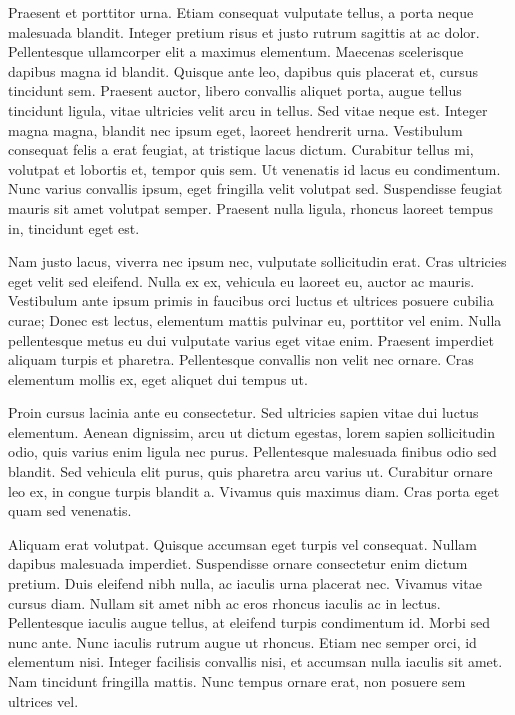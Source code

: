 Praesent et porttitor urna. Etiam consequat vulputate tellus, a porta neque
malesuada blandit. Integer pretium risus et justo rutrum sagittis at ac dolor.
Pellentesque ullamcorper elit a maximus elementum. Maecenas scelerisque dapibus
magna id blandit. Quisque ante leo, dapibus quis placerat et, cursus tincidunt
sem. Praesent auctor, libero convallis aliquet porta, augue tellus tincidunt
ligula, vitae ultricies velit arcu in tellus. Sed vitae neque est. Integer
magna magna, blandit nec ipsum eget, laoreet hendrerit urna. Vestibulum
consequat felis a erat feugiat, at tristique lacus dictum. Curabitur tellus mi,
volutpat et lobortis et, tempor quis sem. Ut venenatis id lacus eu condimentum.
Nunc varius convallis ipsum, eget fringilla velit volutpat sed. Suspendisse
feugiat mauris sit amet volutpat semper. Praesent nulla ligula, rhoncus laoreet
tempus in, tincidunt eget est.

Nam justo lacus, viverra nec ipsum nec, vulputate sollicitudin erat. Cras
ultricies eget velit sed eleifend. Nulla ex ex, vehicula eu laoreet eu, auctor
ac mauris. Vestibulum ante ipsum primis in faucibus orci luctus et ultrices
posuere cubilia curae; Donec est lectus, elementum mattis pulvinar eu,
porttitor vel enim. Nulla pellentesque metus eu dui vulputate varius eget vitae
enim. Praesent imperdiet aliquam turpis et pharetra. Pellentesque convallis non
velit nec ornare. Cras elementum mollis ex, eget aliquet dui tempus ut.

Proin cursus lacinia ante eu consectetur. Sed ultricies sapien vitae dui luctus
elementum. Aenean dignissim, arcu ut dictum egestas, lorem sapien sollicitudin
odio, quis varius enim ligula nec purus. Pellentesque malesuada finibus odio
sed blandit. Sed vehicula elit purus, quis pharetra arcu varius ut. Curabitur
ornare leo ex, in congue turpis blandit a. Vivamus quis maximus diam. Cras
porta eget quam sed venenatis.

Aliquam erat volutpat. Quisque accumsan eget turpis vel consequat. Nullam
dapibus malesuada imperdiet. Suspendisse ornare consectetur enim dictum
pretium. Duis eleifend nibh nulla, ac iaculis urna placerat nec. Vivamus vitae
cursus diam. Nullam sit amet nibh ac eros rhoncus iaculis ac in lectus.
Pellentesque iaculis augue tellus, at eleifend turpis condimentum id. Morbi sed
nunc ante. Nunc iaculis rutrum augue ut rhoncus. Etiam nec semper orci, id
elementum nisi. Integer facilisis convallis nisi, et accumsan nulla iaculis sit
amet. Nam tincidunt fringilla mattis. Nunc tempus ornare erat, non posuere sem
ultrices vel.

